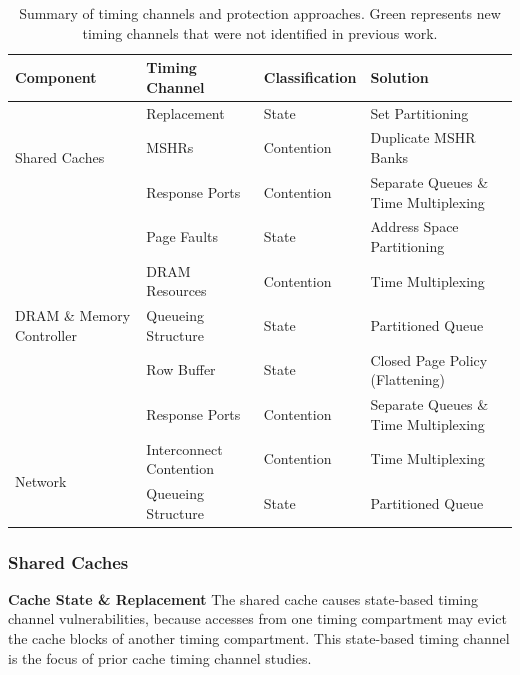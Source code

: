 \def\novelcolor{Green}
\begin{table}
\begin{tabular}{l|l|l|l}
    \hline
    Component & Timing Channel & Classification & Solution\\
    \hline
    \multirow{3}{*}{Shared Caches}
    & Replacement & State  & Set Partitioning \\
    \hhline{~---}
    & {\color{\novelcolor}MSHRs}
    & {\color{\novelcolor}Contention }
    & {\color{\novelcolor}Duplicate MSHR Banks} \\
    \hhline{~---}
    & {\color{\novelcolor}Response Ports}
    & {\color{\novelcolor}Contention }
    & {\color{\novelcolor}Separate Queues \& Time Multiplexing}\\
    \hline
    \multirow{5}{*}{DRAM \& Memory Controller}
    & Page Faults & State  & Address Space Partitioning \\
    \hhline{~---}
    & DRAM Resources & Contention  & Time Multiplexing \\
    \hhline{~---}
    & Queueing Structure & State  & Partitioned Queue \\
    \hhline{~---}
    & Row Buffer & State & Closed Page Policy (Flattening)\\
    \hhline{~---}
    & {\color{\novelcolor} Response Ports} 
    & {\color{\novelcolor} Contention }
    & {\color{\novelcolor} Separate Queues \& Time Multiplexing}\\
    \hline
    \multirow{2}{*}{Network} 
    & Interconnect Contention & Contention & Time Multiplexing \\
    \hhline{~---}
    & Queueing Structure & State & Partitioned Queue \\
\end{tabular}
    \caption{Summary of timing channels and protection approaches. Green represents new timing channels that were not identified in previous work.}
    \label{table:timing_chan_summary}
\end{table}

\subsubsection{Shared Caches}
\mbox{}\newline
\textbf{Cache State \& Replacement}
The shared cache causes state-based timing channel vulnerabilities, because accesses
from one timing compartment may evict the cache blocks of another timing compartment.
This state-based timing channel is the focus of prior cache timing channel 
studies.

